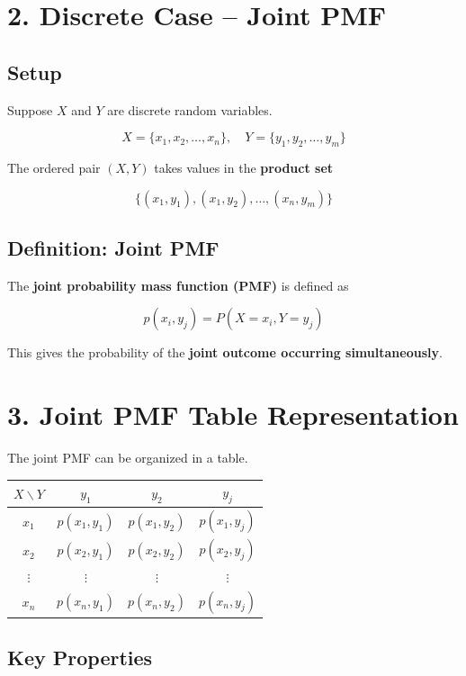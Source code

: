 \documentclass[12pt]{article}
\begin{document}
\section*{2. Discrete Case -- Joint PMF}

\subsection*{Setup}

Suppose $X$ and $Y$ are discrete random variables.

\[
X = \{x_1, x_2, \dots, x_n\}, \quad
Y = \{y_1, y_2, \dots, y_m\}
\]

The ordered pair $(X,Y)$ takes values in the \textbf{product set}

\[
\{(x_1,y_1),(x_1,y_2),\dots,(x_n,y_m)\}
\]

\subsection*{Definition: Joint PMF}

The \textbf{joint probability mass function (PMF)} is defined as

\[
p(x_i, y_j) = P(X = x_i, Y = y_j)
\]

This gives the probability of the \textbf{joint outcome occurring simultaneously}.

\section*{3. Joint PMF Table Representation}

The joint PMF can be organized in a table.

\begin{center}
\begin{tabular}{c|c c c}
$X \backslash Y$ & $y_1$ & $y_2$ & $y_j$ \\
\hline
$x_1$ & $p(x_1,y_1)$ & $p(x_1,y_2)$ & $p(x_1,y_j)$ \\
$x_2$ & $p(x_2,y_1)$ & $p(x_2,y_2)$ & $p(x_2,y_j)$ \\
$\vdots$ & $\vdots$ & $\vdots$ & $\vdots$ \\
$x_n$ & $p(x_n,y_1)$ & $p(x_n,y_2)$ & $p(x_n,y_j)$ \\
\end{tabular}
\end{center}

\subsection*{Key Properties}
\end{document}
